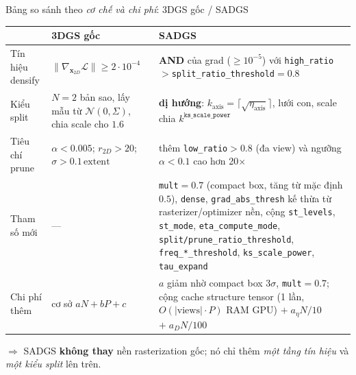 \begin{frame}{Bảng so sánh theo \emph{cơ chế và chi phí}: 3DGS gốc / SADGS}
\scriptsize
\begin{table}
\centering
\begin{tabular}{p{2.6cm} p{4.6cm} p{5.2cm}}
\toprule
 & \textbf{3DGS gốc} & \textbf{SADGS} \\
\midrule
Tín hiệu densify &
$\|\nabla_{\mathbf{x}_{2D}}\mathcal{L}\|\!\ge\!2{\cdot}10^{-4}$ &
\textbf{AND} của grad ($\ge 10^{-5}$) với \texttt{high\_ratio}$>$\texttt{split\_ratio\_threshold}$=0.8$ \\[1mm]
Kiểu split &
$N{=}2$ bản sao, lấy mẫu từ $\mathcal{N}(0,\Sigma)$, chia scale cho $1.6$ &
\textbf{dị hướng}: $k_{\text{axis}}{=}\lceil\sqrt{\eta_{\text{axis}}}\rceil$, lưới con, scale chia $k^{\texttt{ks\_scale\_power}}$ \\[1mm]
Tiêu chí prune &
$\alpha<0.005$; $r_{2D}{>}20$; $\sigma{>}0.1\,\text{extent}$ &
thêm \texttt{low\_ratio}$>0.8$ (đa view) và ngưỡng $\alpha<0.1$ cao hơn 20$\times$ \\[1mm]
Tham số mới &
--- &
\texttt{mult}$=0.7$ (compact box, tăng từ mặc định $0.5$), \texttt{dense}, \texttt{grad\_abs\_thresh} kế thừa từ rasterizer/optimizer nền, cộng \texttt{st\_levels}, \texttt{st\_mode}, \texttt{eta\_compute\_mode}, \texttt{split/prune\_ratio\_threshold}, \texttt{freq\_*\_threshold}, \texttt{ks\_scale\_power}, \texttt{tau\_expand} \\[1mm]
Chi phí thêm &
cơ sở $aN+bP+c$ &
$a$ giảm nhờ compact box $3\sigma$, \texttt{mult}$=0.7$; cộng cache structure tensor (1 lần, $O(|\text{views}|\!\cdot\!P)$ RAM GPU) $+\;a_\eta N/10$ $+\;a_D N/100$ \\
\bottomrule
\end{tabular}
\end{table}
\vspace{-1mm}
$\Rightarrow$ SADGS \textbf{không thay} nền rasterization gốc; nó chỉ thêm \emph{một tầng tín hiệu} và \emph{một kiểu split} lên trên.
\end{frame}

